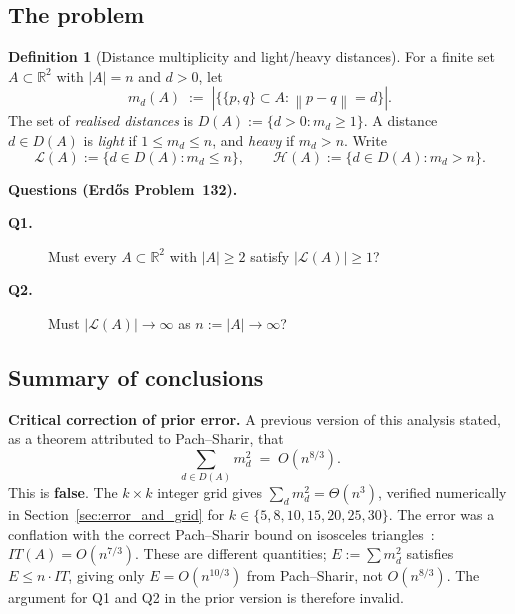 \documentclass[12pt,a4paper]{amsart}
\theoremstyle{plain}
\theoremstyle{definition}
\newtheorem{definition}[theorem]{Definition}
\newcommand{\R}{\mathbb{R}}
\newcommand{\abs}[1]{\left\lvert #1 \right\rvert}
\newcommand{\norm}[1]{\left\lVert #1 \right\rVert}
\newcommand{\cL}{\mathcal{L}}
\newcommand{\cH}{\mathcal{H}}
\begin{document}
\subsection{The problem}

\begin{definition}[Distance multiplicity and light/heavy distances]
\label{def:main}
For a finite set $A \subset \R^2$ with $\abs{A} = n$ and $d > 0$, let
\[
  m_d(A) \;:=\; \abs{\bigl\{\{p,q\} \subset A : \norm{p-q} = d\bigr\}}.
\]
The set of \emph{realised distances} is $D(A) := \{d > 0 : m_d \ge 1\}$.
A distance $d \in D(A)$ is \emph{light} if $1 \le m_d \le n$, and
\emph{heavy} if $m_d > n$.  Write
\[
  \cL(A) := \{d \in D(A) : m_d \le n\}, \qquad
  \cH(A) := \{d \in D(A) : m_d > n\}.
\]
\end{definition}

\noindent\textbf{Questions (Erd\H{o}s Problem~132).}
\begin{description}
  \item[\textbf{Q1.}] Must every $A \subset \R^2$ with $\abs{A} \ge 2$
        satisfy $\abs{\cL(A)} \ge 1$?
  \item[\textbf{Q2.}] Must $\abs{\cL(A)} \to \infty$ as $n := \abs{A}
        \to \infty$?
\end{description}

\subsection{Summary of conclusions}

\begin{mdframed}[style=warning]
\textbf{Critical correction of prior error.}
A previous version of this analysis stated, as a theorem attributed to
Pach--Sharir, that
\[
  \sum_{d \in D(A)} m_d^2 \;=\; O(n^{8/3}).
\]
This is \textbf{false}.
The $k \times k$ integer grid gives $\sum_d m_d^2 = \Theta(n^3)$,
verified numerically in Section~\ref{sec:error_and_grid} for
$k \in \{5,8,10,15,20,25,30\}$.
The error was a conflation with the correct Pach--Sharir bound
on isosceles triangles~\cite{PS98}: $IT(A) = O(n^{7/3})$.
These are different quantities; $E := \sum m_d^2$ satisfies
$E \le n \cdot IT$, giving only $E = O(n^{10/3})$ from Pach--Sharir,
not $O(n^{8/3})$.
The argument for Q1 and Q2 in the prior version is therefore invalid.
\end{mdframed}
\end{document}
